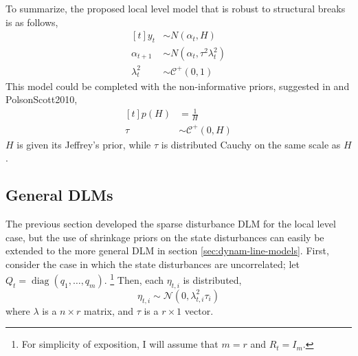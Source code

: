 \documentclass{article}
\newcommand{\dist}[1]{\mathcal{#1}}
\newcommand{\paren}[1]{\ensuremath{\left(#1\right)}}
\newcommand{\dnorm}[1]{\ensuremath{\dist{N}\paren{#1}}}
\newcommand{\dhalfcauchy}[1]{\ensuremath{\dist{C}^{+}\paren{#1}}}
\DeclareMathOperator{\diag}{diag}
\begin{document}
To summarize, the proposed local level model that is robust to structural breaks is as follows,
\begin{equation}
  \label{eq:10}
  \begin{aligned}[t]
    y_{t} &\sim N(\alpha_{t}, H) \\
    \alpha_{t + 1} &\sim N(\alpha_{t}, \tau^{2} \lambda^{2}_{t}) \\
    \lambda^{2}_{t} & \sim \dhalfcauchy{0, 1}
  \end{aligned}
\end{equation}
This model could be completed with the non-informative priors, suggested in \textcite{CarvalhoPolsonScott2009} and {PolsonScott2010},
\begin{equation}
  \label{eq:7}
  \begin{aligned}[t]
    p(H) &= \frac{1}{H} \\
    \tau &\sim \dhalfcauchy{0, H}
  \end{aligned}
\end{equation}
$H$ is given its Jeffrey's prior, while $\tau$ is distributed Cauchy on the same scale as $H$.

\subsection{General DLMs}
\label{sec:multivariate}

The previous section developed the sparse disturbance DLM for the local level case, but the use of shrinkage priors on the state disturbances can easily be extended to the more general DLM in section \ref{sec:dynam-line-models}.
First, consider the case in which the state disturbances are uncorrelated; let $Q_{t} = \diag(q_{1}, \dots, q_{m})$.%
\footnote{
  For simplicity of exposition, I will assume that $m = r$ and $R_{t} = I_{m}$.
}
Then, each $\eta_{t,i}$ is distributed,
\begin{equation}
  \label{eq:20}
  \eta_{t,i} \sim \dnorm{0, \lambda_{t,i}^{2} \tau_{i}}
\end{equation}
where $\lambda$ is a $n \times r$ matrix, and $\tau$ is a $r \times 1$ vector.
\end{document}
